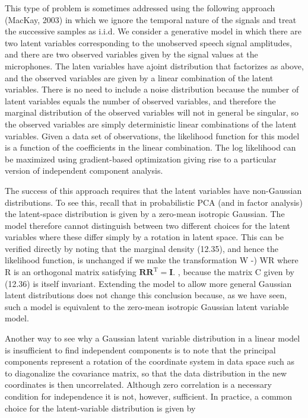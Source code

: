 \documentclass[
  10
]{article}
\begin{document}
This type of problem is sometimes addressed using the following approach
(MacKay, 2003) in which we ignore the temporal nature of the signals and
treat the successive samples as i.i.d. We consider a generative model in
which there are two latent variables corresponding to the unobserved
speech signal amplitudes, and there are two observed variables given by
the signal values at the microphones. The laten variables have ajoint
distribution that factorizes as above, and the observed variables are
given by a linear combination of the latent variables. There is no need
to include a noise distribution because the number of latent variables
equals the number of observed variables, and therefore the marginal
distribution of the observed variables will not in general be singular,
so the observed variables are simply deterministic linear combinations
of the latent variables. Given a data set of observations, the
likelihood function for this model is a function of the coefficients in
the linear combination. The log likelihood can be maximized using
gradient-based optimization giving rise to a particular version of
independent component analysis.

The success of this approach requires that the latent variables have
non-Gaussian distributions. To see this, recall that in probabilistic
PCA (and in factor analysis) the latent-space distribution is given by a
zero-mean isotropic Gaussian. The model therefore cannot distinguish
between two different choices for the latent variables where these
differ simply by a rotation in latent space. This can be verified
directly by noting that the marginal density (12.35), and hence the
likelihood function, is unchanged if we make the transformation W -) WR
where R is an orthogonal matrix satisfying
\(\mathbf { R R } ^ { \mathrm { T } } = \mathbf { I } .\) , because the
matrix C given by (12.36) is itself invariant. Extending the model to
allow more general Gaussian latent distributions does not change this
conclusion because, as we have seen, such a model is equivalent to the
zero-mean isotropic Gaussian latent variable model.

Another way to see why a Gaussian latent variable distribution in a
linear model is insufficient to find independent components is to note
that the principal components represent a rotation of the coordinate
system in data space such as to diagonalize the covariance matrix, so
that the data distribution in the new coordinates is then uncorrelated.
Although zero correlation is a necessary condition for independence it
is not, however, sufficient. In practice, a common choice for the
latent-variable distribution is given by
\end{document}
